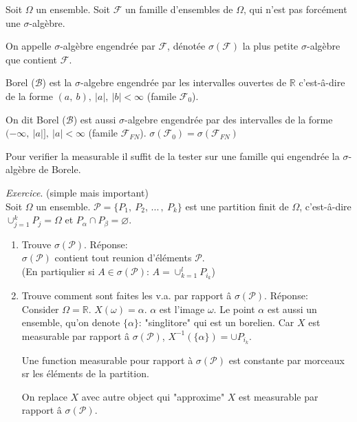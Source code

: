 Soit $\Omega$ un ensemble. Soit $\mathcal{F}$ un famille d'ensembles de $\Omega$, qui n'est pas forcément une $\sigma$-algèbre.

\begin{definition}
	On appelle $\sigma$-algèbre engendrée par $\mathcal{F}$, dénotée $\sigma(\mathcal{F})$ la plus petite $\sigma$-algèbre que contient $\mathcal{F}$.
\end{definition}

\begin{definition}
	Borel ($\mathcal{B}$) est la $\sigma$-algebre engendrée par les intervalles ouvertes de $\mathbb{R}$ c'est-â-dire de la forme $(a,\ b),\ |a|,\ |b| < \infty$ (famile $\mathcal{F}_0$).
\end{definition}

\begin{remark}
On dit Borel ($\mathcal{B}$) est aussi $\sigma$-algebre engendrée par des intervalles de la forme $(-\infty,\ |a|],\ |a|<\infty$ (famile $\mathcal{F}_{FN}$).
	$\sigma(\mathcal{F}_0)=\sigma(\mathcal{F}_{FN})$
\end{remark}

\begin{proposition}
	Pour verifier la measurable il suffit de la tester sur une famille qui engendrée la $\sigma$-algèbre de Borele.
\end{proposition}

\emph{Exercice}. (simple mais important)\\
Soit $\Omega$ un ensemble. $\mathcal{P}= \{P_1,\ P_2,\,...\,,\ P_k\}$ est une partition finit de $\Omega$, c'est-â-dire $\cup_{j=1}^k P_j=\Omega$ et $P_\alpha\cap P_\beta=\varnothing$.

\begin{enumerate}
	\item Trouve $\sigma(\mathcal{P})$. Réponse:\\
	$\sigma(\mathcal{P})$ contient tout reunion d'éléments $\mathcal{P}$.\\
(En partiqulier si $A\in\sigma(\mathcal{P})$: $A=\cup_{k=1}^l P_{i_k}$)
	\item Trouve comment sont faites les v.a. par rapport â $\sigma(\mathcal{P})$. Réponse:\\
	Consider $\Omega=\mathbb{R}$. $X(\omega)=\alpha$. $\alpha$ est l'image $\omega$. Le point  $\alpha$ est aussi un ensemble, qu'on denote $\{\alpha\}$: "singlitore" qui est un borelien. Car $X$ est measurable par rapport â $\sigma(\mathcal{P})$, $X^{-1}(\{\alpha\})=\cup P_{i_k}$.
	
	Une function measurable pour rapport à $\sigma(\mathcal{P})$ est constante par morceaux sr les éléments de la partition. 
	
	On replace $X$ avec autre object qui "approxime" $X$ est measurable par rapport â $\sigma(\mathcal{P})$.
\end{enumerate}

